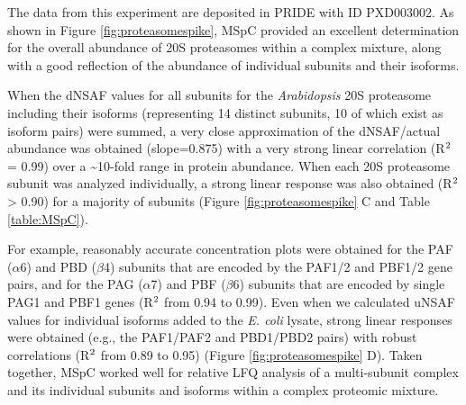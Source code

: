 The data from this experiment are deposited in PRIDE with ID PXD003002.
As shown in Figure \ref{fig:proteasomespike}, MSpC provided an excellent determination for the overall abundance of 20S proteasomes within a complex mixture, along with a good reflection of the abundance of individual subunits and their isoforms.

When the dNSAF values for all subunits for the \textit{Arabidopsis} 20S proteasome including their isoforms (representing 14 distinct subunits, 10 of which exist as isoform pairs) were summed, a very close approximation of the dNSAF/actual abundance was obtained (slope=0.875) with a very strong linear correlation (R$\textsuperscript{2}$ = 0.99) over a \textasciitilde10-fold range in protein abundance.  
When each 20S proteasome subunit was analyzed individually, a strong linear response was also obtained (R$\textsuperscript{2}$ > 0.90) for a majority of subunits (Figure \ref{fig:proteasomespike} C and Table \ref{table:MSpC}).

For example, reasonably accurate concentration plots were obtained for the PAF ($\alpha$6) and PBD ($\beta$4) subunits that are encoded by the PAF1/2 and PBF1/2 gene pairs, and for the PAG ($\alpha$7) and PBF ($\beta$6) subunits that are encoded by single PAG1 and PBF1 genes (R$\textsuperscript{2}$  from 0.94 to 0.99).
Even when we calculated uNSAF values for individual isoforms added to the \textit{E. coli} lysate, strong linear responses were obtained (e.g., the PAF1/PAF2 and PBD1/PBD2 pairs) with robust correlations (R$\textsuperscript{2}$ from 0.89 to 0.95) (Figure \ref{fig:proteasomespike} D).
Taken together, MSpC worked well for relative LFQ analysis of a multi-subunit complex and its individual subunits and isoforms within a complex proteomic mixture.

